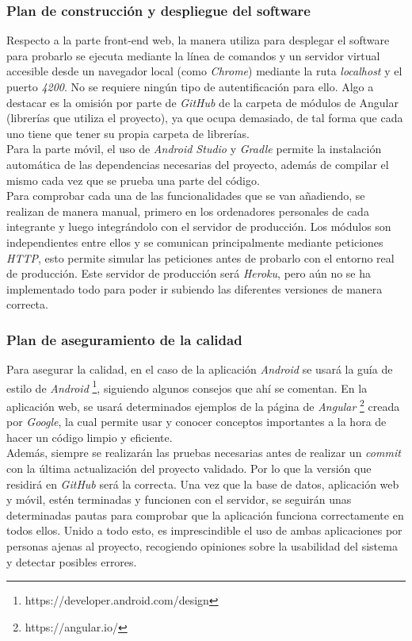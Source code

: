 \documentclass{article}
\begin{document}
\subsubsection{Plan de construcción y despliegue del software}
Respecto a la parte front-end web, la manera utiliza para desplegar el software para probarlo se ejecuta mediante la línea de comandos y un servidor virtual accesible desde un navegador local (como \textit{Chrome}) mediante la ruta \textit{localhost} y el puerto \textit{4200}. No se requiere ningún tipo de autentificación para ello.
Algo a destacar es la omisión por parte de \textit{GitHub} de la carpeta de módulos de Angular (librerías que utiliza el proyecto), ya que ocupa demasiado, de tal forma que cada uno tiene que tener su propia carpeta de librerías.\\
\hfill \break
Para la parte móvil, el uso de \textit{Android Studio} y \textit{Gradle} permite la instalación automática de las dependencias necesarias del proyecto, además de compilar el mismo cada vez que se prueba una parte del código.\\
\hfill \break
Para comprobar cada una de las funcionalidades que se van añadiendo, se realizan de manera manual, primero en los ordenadores personales de cada integrante y luego integrándolo con el servidor de producción. 
Los módulos son independientes entre ellos y se comunican principalmente mediante peticiones \textit{HTTP}, esto permite simular las peticiones antes de probarlo con el entorno real de producción. 
Este servidor de producción será \textit{Heroku}, pero aún no se ha implementado todo para poder ir subiendo las diferentes versiones de manera correcta. 

\subsubsection{Plan de aseguramiento de la calidad}
Para asegurar la calidad, en el caso de la aplicación \textit{Android} se usará la guía de estilo de \textit{Android} \footnote{https://developer.android.com/design}, siguiendo algunos consejos que ahí se comentan. En la aplicación web, se usará determinados ejemplos de la página de \textit{Angular} \footnote{https://angular.io/} creada por \textit{Google}, la cual permite usar y conocer conceptos importantes a la hora de hacer un código limpio y eficiente. \\
\hfill \break
Además, siempre se realizarán las pruebas necesarias antes de realizar un \textit{commit} con la última actualización del proyecto validado. Por lo que la versión que residirá en \textit{GitHub} será la correcta. 
\hfill \break
Una vez que la base de datos, aplicación web y móvil, estén terminadas y funcionen con el servidor, se seguirán unas determinadas pautas para comprobar que la aplicación funciona correctamente en todos ellos.  
Unido a todo esto, es imprescindible el uso de ambas aplicaciones por personas ajenas al proyecto, recogiendo opiniones sobre la usabilidad del sistema y detectar posibles errores. 
\end{document}
